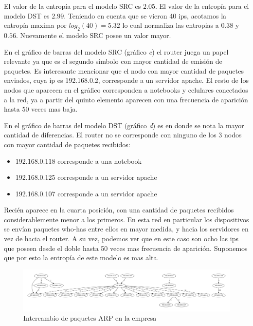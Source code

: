 El valor de la entropía para el modelo SRC es $2.05$. El valor de la entropía
para el modelo DST es $2.99$. Teniendo en cuenta que se vieron 40 ips, 
acotamos la entrop\'ia maxima por $log_2(40)=5.32$ lo cual normaliza las 
entropias a $0.38$ y $0.56$. Nuevamente el modelo SRC posee un valor mayor.

En el gráfico de barras del modelo SRC (gr\'afico \emph{c}) el router juega
un papel relevante
ya que es el segundo símbolo con mayor cantidad de emisión de paquetes. Es
interesante mencionar que el nodo con mayor cantidad de paquetes enviados, 
cuya ip es 192.168.0.2, corresponde a un servidor apache. 
El resto de los nodos que aparecen en el gráfico corresponden a notebooks
y celulares conectados a la red, ya a partir del quinto elemento aparecen
con una frecuencia de aparici\'on hasta 50 veces mas baja.

En el gráfico de barras del modelo DST (gr\'afico \emph{d}) es en donde se nota
la mayor cantidad de diferencias. El router no se corresponde con ninguno de los
3 nodos con mayor cantidad de paquetes recibidos:

\begin{itemize}
    \item 192.168.0.118 corresponde a una notebook
    \item 192.168.0.125 corresponde a un servidor apache
    \item 192.168.0.107 corresponde a un servidor apache
\end{itemize}

Recién aparece en la cuarta posición, con una cantidad de paquetes recibidos
considerablemente menor a los primeros. En esta red en particular los
dispositivos se envían paquetes who-has entre ellos en mayor medida, y hacia
los servidores en vez de hacia el router. A su vez, podemos ver que en este
caso son ocho las ips que poseen desde el doble hasta 50 veces mas frecuencia
de aparici\'on. Suponemos que por esto la entrop\'ia de este modelo es mas alta.

\begin{figure}[H]
	\center
	\includegraphics[scale=0.3]{resultados/empresa/conectividad.pdf}
	\caption{Intercambio de paquetes ARP en la empresa}
\end{figure}



